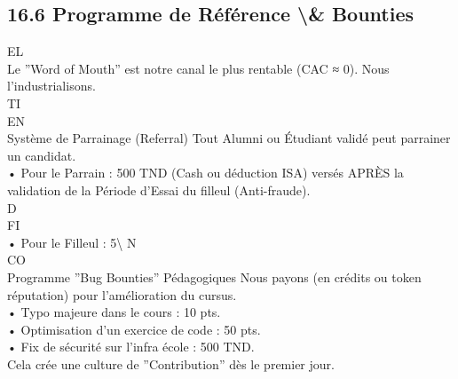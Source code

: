 \documentclass[12pt,landscape,a4paper]{article}
\begin{document}
\subsection{16.6 Programme de Référence \textbackslash{}& Bounties}
\vspace{0.5em}
\vspace{0.5em}
\vspace{0.5em}
\vspace{0.5em}
EL\\
Le ”Word of Mouth” est notre canal le plus rentable (CAC ≈ 0). Nous l’industrialisons.\\
\vspace{0.5em}
\vspace{0.5em}
\vspace{0.5em}
\vspace{0.5em}
TI\\
EN\\
Système de Parrainage (Referral)       Tout Alumni ou Étudiant validé peut parrainer un candidat.\\
\vspace{0.5em}
• Pour le Parrain : 500 TND (Cash ou déduction ISA) versés APRÈS la validation de la Période d’Essai du filleul (Anti-fraude).\\
\vspace{0.5em}
\vspace{0.5em}
\vspace{0.5em}
\vspace{0.5em}
D\\
FI\\
• Pour le Filleul : 5\textbackslash{}%
\vspace{0.5em}
N\\
CO\\
Programme ”Bug Bounties” Pédagogiques           Nous payons (en crédits ou token réputation) pour l’amélioration du cursus.\\
\vspace{0.5em}
• Typo majeure dans le cours : 10 pts.\\
\vspace{0.5em}
• Optimisation d’un exercice de code : 50 pts.\\
\vspace{0.5em}
• Fix de sécurité sur l’infra école : 500 TND.\\
\vspace{0.5em}
Cela crée une culture de ”Contribution” dès le premier jour.\\
\end{document}
